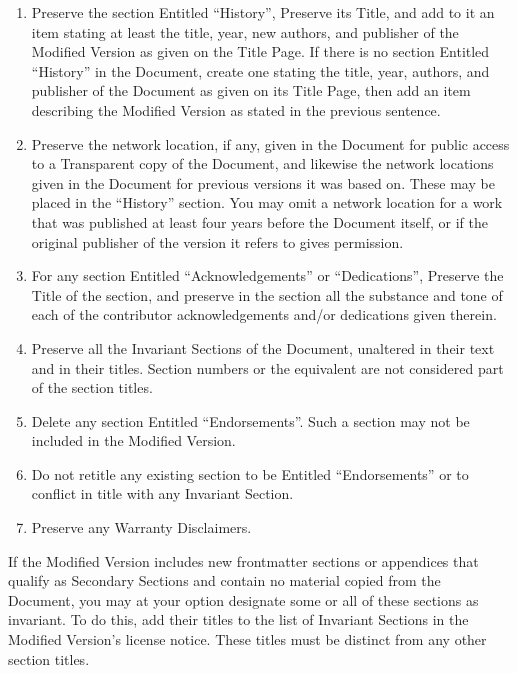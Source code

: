 \documentclass[letterpaper,10pt,english]{sphinxmanual}
\begin{document}
\begin{enumerate}
\item {} 
\sphinxAtStartPar
Preserve the section Entitled “History”, Preserve its Title, and add to it an item stating at least the title, year, new authors, and publisher of the Modified Version as given on the Title Page. If there is no section Entitled “History” in the Document, create one stating the title, year, authors, and publisher of the Document as given on its Title Page, then add an item describing the Modified Version as stated in the previous sentence.

\item {} 
\sphinxAtStartPar
Preserve the network location, if any, given in the Document for public access to a Transparent copy of the Document, and likewise the network locations given in the Document for previous versions it was based on. These may be placed in the “History” section. You may omit a network location for a work that was published at least four years before the Document itself, or if the original publisher of the version it refers to gives permission.

\item {} 
\sphinxAtStartPar
For any section Entitled “Acknowledgements” or “Dedications”, Preserve the Title of the section, and preserve in the section all the substance and tone of each of the contributor acknowledgements and/or dedications given therein.

\item {} 
\sphinxAtStartPar
Preserve all the Invariant Sections of the Document, unaltered in their text and in their titles. Section numbers or the equivalent are not considered part of the section titles.

\item {} 
\sphinxAtStartPar
Delete any section Entitled “Endorsements”. Such a section may not be included in the Modified Version.

\item {} 
\sphinxAtStartPar
Do not retitle any existing section to be Entitled “Endorsements” or to conflict in title with any Invariant Section.

\item {} 
\sphinxAtStartPar
Preserve any Warranty Disclaimers.

\end{enumerate}

\sphinxAtStartPar
If the Modified Version includes new front\sphinxhyphen{}matter sections or appendices that qualify as Secondary Sections and contain no material copied from the Document, you may at your option designate some or all of these sections as invariant. To do this, add their titles to the list of Invariant Sections in the Modified Version’s license notice. These titles must be distinct from any other section titles.
\end{document}

